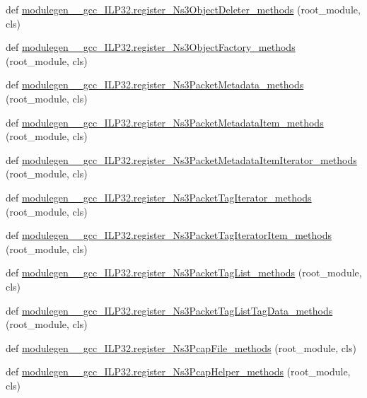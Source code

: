 \begin{DoxyCompactItemize}
\item 
def \hyperlink{namespacemodulegen____gcc__ILP32_ae7b70d95135f82e9f3f5abb42654e3de}{modulegen\+\_\+\+\_\+gcc\+\_\+\+I\+L\+P32.\+register\+\_\+\+Ns3\+Object\+Deleter\+\_\+methods} (root\+\_\+module, cls)
\item 
def \hyperlink{namespacemodulegen____gcc__ILP32_a3c95ec67fc1514c6b5c58314ef81e38e}{modulegen\+\_\+\+\_\+gcc\+\_\+\+I\+L\+P32.\+register\+\_\+\+Ns3\+Object\+Factory\+\_\+methods} (root\+\_\+module, cls)
\item 
def \hyperlink{namespacemodulegen____gcc__ILP32_a219b8e3d7145a4b09888203032e16df7}{modulegen\+\_\+\+\_\+gcc\+\_\+\+I\+L\+P32.\+register\+\_\+\+Ns3\+Packet\+Metadata\+\_\+methods} (root\+\_\+module, cls)
\item 
def \hyperlink{namespacemodulegen____gcc__ILP32_aa4a4a003c4a8b7886a31cb3d1b2f9062}{modulegen\+\_\+\+\_\+gcc\+\_\+\+I\+L\+P32.\+register\+\_\+\+Ns3\+Packet\+Metadata\+Item\+\_\+methods} (root\+\_\+module, cls)
\item 
def \hyperlink{namespacemodulegen____gcc__ILP32_af0c41f86c2c7e2875da9fd12e03ec3df}{modulegen\+\_\+\+\_\+gcc\+\_\+\+I\+L\+P32.\+register\+\_\+\+Ns3\+Packet\+Metadata\+Item\+Iterator\+\_\+methods} (root\+\_\+module, cls)
\item 
def \hyperlink{namespacemodulegen____gcc__ILP32_a9af269241fe2e52d9713c6fef73ade54}{modulegen\+\_\+\+\_\+gcc\+\_\+\+I\+L\+P32.\+register\+\_\+\+Ns3\+Packet\+Tag\+Iterator\+\_\+methods} (root\+\_\+module, cls)
\item 
def \hyperlink{namespacemodulegen____gcc__ILP32_a81cdb0716a2447fa9ebf30a8a43132d5}{modulegen\+\_\+\+\_\+gcc\+\_\+\+I\+L\+P32.\+register\+\_\+\+Ns3\+Packet\+Tag\+Iterator\+Item\+\_\+methods} (root\+\_\+module, cls)
\item 
def \hyperlink{namespacemodulegen____gcc__ILP32_a7f10f5444037901328380d4d5c08291a}{modulegen\+\_\+\+\_\+gcc\+\_\+\+I\+L\+P32.\+register\+\_\+\+Ns3\+Packet\+Tag\+List\+\_\+methods} (root\+\_\+module, cls)
\item 
def \hyperlink{namespacemodulegen____gcc__ILP32_aa623e91ff45aa8dce22ab35f70e26187}{modulegen\+\_\+\+\_\+gcc\+\_\+\+I\+L\+P32.\+register\+\_\+\+Ns3\+Packet\+Tag\+List\+Tag\+Data\+\_\+methods} (root\+\_\+module, cls)
\item 
def \hyperlink{namespacemodulegen____gcc__ILP32_a6f9559ad329fc07d113c60175da4c407}{modulegen\+\_\+\+\_\+gcc\+\_\+\+I\+L\+P32.\+register\+\_\+\+Ns3\+Pcap\+File\+\_\+methods} (root\+\_\+module, cls)
\item 
def \hyperlink{namespacemodulegen____gcc__ILP32_ad23ad74660470f64681b3cc1718dcff6}{modulegen\+\_\+\+\_\+gcc\+\_\+\+I\+L\+P32.\+register\+\_\+\+Ns3\+Pcap\+Helper\+\_\+methods} (root\+\_\+module, cls)

\end{DoxyCompactItemize}
